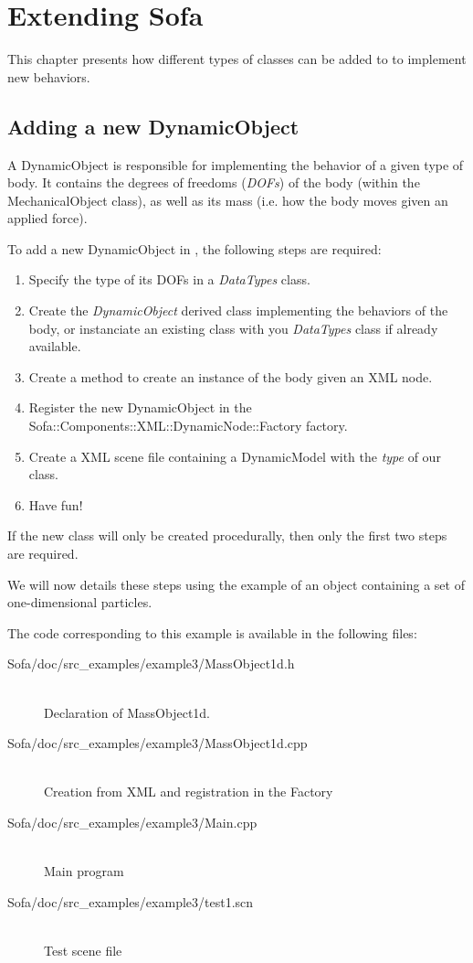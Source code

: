 \chapter{Extending Sofa}

This chapter presents how different types of classes can be added to \sofa{} to implement new behaviors.

\section{Adding a new DynamicObject}

A DynamicObject is responsible for implementing the behavior of a given type of body. It contains the degrees of freedoms (\textit{DOFs}) of the body (within the MechanicalObject class), as well as its mass (i.e. how the body moves given an applied force).

To add a new DynamicObject in \sofa, the following steps are required:

\begin{enumerate}
\item Specify the type of its DOFs in a \textit{DataTypes} class.
\item Create the \textit{DynamicObject} derived class implementing the behaviors of the body, or instanciate an existing class with you \textit{DataTypes} class if already available.
\item Create a method to create an instance of the body given an XML node.
\item Register the new DynamicObject in the Sofa::Components::XML::DynamicNode::Factory factory.
\item Create a XML scene file containing a DynamicModel with the \textit{type} of our class.
\item Have fun!
\end{enumerate}

If the new class will only be created procedurally, then only the first two steps are required.

We will now details these steps using the example of an object containing a set of one-dimensional particles.

The code corresponding to this example is available in the following files:
\begin{description}
\item[Sofa/doc/src\_examples/example3/MassObject1d.h]~\\
 Declaration of MassObject1d.
\item[Sofa/doc/src\_examples/example3/MassObject1d.cpp]~\\
 Creation from XML and registration in the Factory
\item[Sofa/doc/src\_examples/example3/Main.cpp]~\\
 Main program
\item[Sofa/doc/src\_examples/example3/test1.scn]~\\
 Test scene file
\end{description}

